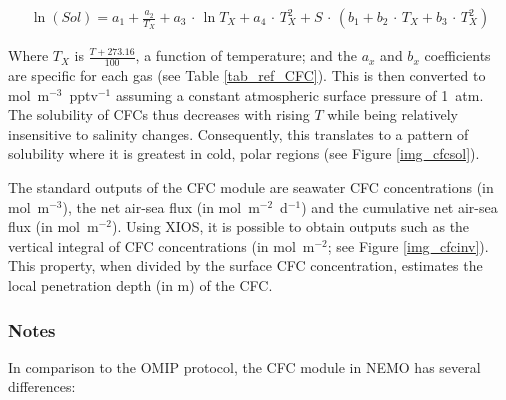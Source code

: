 \documentclass[../main/TOP_manual]{subfiles}
\begin{document}
\begin{eqnarray}
\ln{(Sol)} = a_1 + \frac{a_2}{ T_{X}} + a_3 \, \cdot \, \ln{ T_{X} } + a_4 \, \cdot \, T_{X}^2 + S \, \cdot \, ( b_1 + b_2 \, \cdot \, T_{X} + b_3 \, \cdot \, T_{X}^2 )
\label{equ_Sol_CFC}
\end{eqnarray}


Where $T_{X}$ is $\frac{T + 273.16}{100}$, a function of temperature;
and the $a_{x}$ and $b_{x}$ coefficients are specific for each gas (see Table \autoref{tab_ref_CFC}).
This is then converted to mol~m$^{-3}$~pptv$^{-1}$ assuming a constant atmospheric surface pressure of 1~atm.
The solubility of CFCs thus decreases with rising $T$ while being relatively insensitive to salinity changes.
Consequently, this translates to a pattern of solubility where it is greatest in cold, polar regions (see Figure \autoref{img_cfcsol}).


The standard outputs of the CFC module are seawater CFC concentrations (in mol~m$^{-3}$), the net air-sea flux (in mol~m$^{-2}$~d$^{-1}$) and the cumulative net air-sea flux (in mol~m$^{-2}$).
Using XIOS, it is possible to obtain outputs such as the vertical integral of CFC concentrations (in mol~m$^{-2}$; see Figure \autoref{img_cfcinv}).
This property, when divided by the surface CFC concentration, estimates the local penetration depth (in m) of the CFC.


\subsubsection{Notes}

In comparison to the OMIP protocol, the CFC module in NEMO has several differences:
\end{document}
